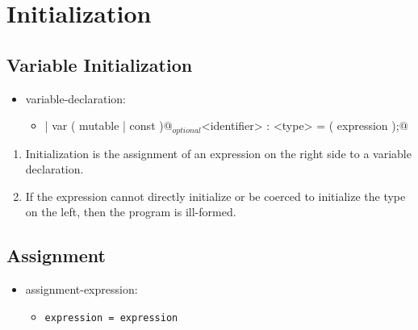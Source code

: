 \section{Initialization}

\subsection{Variable Initialization}
\begin{itemize}[before=\itshape, label={}]
	\item variable-declaration:
	\begin{itemize}[before=\itshape, label={}]
		\item \lstinline@let | var ( mutable | const )@$_{optional}$\lstinline@ <identifier> : <type> = ( expression );@
	\end{itemize}
\end{itemize}
\begin{enumerate}
	\item Initialization is the assignment of an expression on the right side to a variable declaration.
	\item If the expression cannot directly initialize or be coerced to initialize the type on the left, then the program is ill-formed.
\end{enumerate}

\subsection{Assignment}
\begin{itemize}[before=\itshape, label={}]
	\item assignment-expression:
	\begin{itemize}[before=\itshape, label={}]
		\item \lstinline|expression = expression|
	\end{itemize}
\end{itemize}
